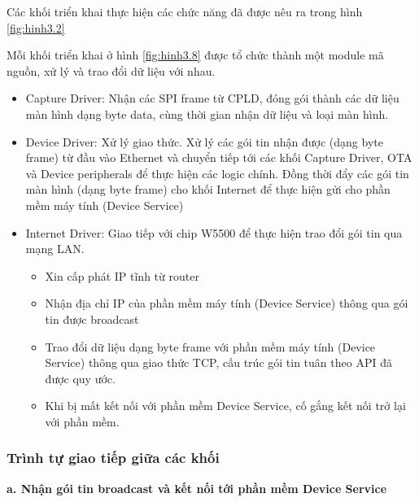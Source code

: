 Các khối triển khai thực hiện các chức năng đã được nêu ra trong hình \ref{fig:hinh3.2}

Mỗi khối triển khai ở hình \ref{fig:hinh3.8} được tổ chức thành một module mã nguồn, xử lý và trao đổi dữ liệu với nhau.

\begin{itemize}
    \item Capture Driver: Nhận các SPI frame từ CPLD, đóng gói thành các dữ liệu màn hình dạng byte data, cùng thời gian nhận dữ liệu và loại màn hình.
    \item Device Driver: Xử lý giao thức. Xử lý các gói tin nhận được (dạng byte frame) từ đầu vào Ethernet và chuyển tiếp tới các khối Capture Driver, OTA và Device peripherals để thực hiện các logic chính. Đồng thời đẩy các gói tin màn hình (dạng byte frame) cho khối Internet để thực hiện gửi cho phần mềm máy tính (Device Service)
    \item Internet Driver: Giao tiếp với chip W5500 để thực hiện trao đổi gói tin qua mạng LAN.
    \begin{itemize}
        \item Xin cấp phát IP tĩnh từ router
        \item Nhận địa chỉ IP của phần mềm máy tính (Device Service) thông qua gói tin được broadcast
        \item Trao đổi dữ liệu dạng byte frame với phần mềm máy tính (Device Service) thông qua giao thức TCP, cấu trúc gói tin tuân theo API đã được quy ước.
        \item Khi bị mất kết nối với phần mềm Device Service, cố gắng kết nối trở lại với phần mềm.
    \end{itemize}
\end{itemize}

\subsubsection{Trình tự giao tiếp giữa các khối}

\textbf{a. Nhận gói tin broadcast và kết nối tới phần mềm Device Service}

